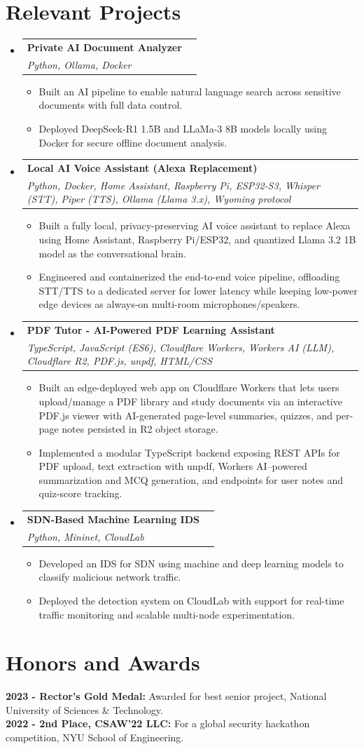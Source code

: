 \documentclass[letterpaper,11pt]{article}
\makeatletter
\newcommand{\resumeItem}[1]{%
  \item{#1 \vspace{-2pt}}%
}
\newcommand{\resumeSubheading}[4]{%
  \vspace{-2pt}\item
  \begin{tabular*}{0.989\textwidth}[t]{l@{\extracolsep{\fill}}r}
    \textbf{#1} & #2 \\
    \textit{\small #3} & \textit{\small #4} \\
  \end{tabular*}\vspace{-7pt}%
}
\newcommand{\resumeSubHeadingListStart}{\begin{itemize}[leftmargin=0.15in,label={},left=0pt]}
\newcommand{\resumeSubHeadingListEnd}{\end{itemize}}
\newcommand{\resumeItemListStart}{\begin{itemize}[left=10pt,itemsep=1.5pt]}
\newcommand{\resumeItemListEnd}{\end{itemize}\vspace{-5pt}}
\makeatother
\begin{document}
\section{Relevant Projects}
\resumeSubHeadingListStart
\resumeSubheading
  {Private AI Document Analyzer}{}
  {Python, Ollama, Docker}{}
  \resumeItemListStart
    \resumeItem{Built an AI pipeline to enable natural language search across sensitive documents with full data control.}
    \resumeItem{Deployed DeepSeek-R1 1.5B and LLaMa-3 8B models locally using Docker for secure offline document analysis.}
  \resumeItemListEnd
\resumeSubheading
  {Local AI Voice Assistant (Alexa Replacement)}{}
  {Python, Docker, Home Assistant, Raspberry Pi, ESP32-S3, Whisper (STT), Piper (TTS), Ollama (Llama 3.x), Wyoming protocol}{}
  \resumeItemListStart
    \resumeItem{Built a fully local, privacy-preserving AI voice assistant to replace Alexa using Home Assistant, Raspberry Pi/ESP32, and quantized Llama 3.2 1B model as the conversational brain.}
    \resumeItem{Engineered and containerized the end-to-end voice pipeline, offloading STT/TTS to a dedicated server for lower latency while keeping low-power edge devices as always-on multi-room microphones/speakers.}
  \resumeItemListEnd
\resumeSubheading
  {PDF Tutor - AI-Powered PDF Learning Assistant}{}
  {TypeScript, JavaScript (ES6), Cloudflare Workers, Workers AI (LLM), Cloudflare R2, PDF.js, unpdf, HTML/CSS}{}
  \resumeItemListStart
    \resumeItem{Built an edge-deployed web app on Cloudflare Workers that lets users upload/manage a PDF library and study documents via an interactive PDF.js viewer with AI-generated page-level summaries, quizzes, and per-page notes persisted in R2 object storage.}
    \resumeItem{Implemented a modular TypeScript backend exposing REST APIs for PDF upload, text extraction with unpdf, Workers AI–powered summarization and MCQ generation, and endpoints for user notes and quiz-score tracking.}
  \resumeItemListEnd
\resumeSubheading
  {SDN-Based Machine Learning IDS}{}
  {Python, Mininet, CloudLab}{}
  \resumeItemListStart
    \resumeItem{Developed an IDS for SDN using machine and deep learning models to classify malicious network traffic.}
    \resumeItem{Deployed the detection system on CloudLab with support for real-time traffic monitoring and scalable multi-node experimentation.}
  \resumeItemListEnd
\resumeSubHeadingListEnd

\section{Honors and Awards}
\noindent
\textbf{2023 - Rector's Gold Medal:} Awarded for best senior project, National University of Sciences \& Technology. \\
\textbf{2022 - 2nd Place, CSAW'22 LLC:} For a global security hackathon competition, NYU School of Engineering.
\end{document}
